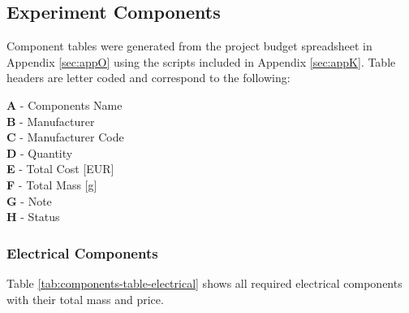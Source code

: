 \documentclass[a4paper,12pt,twoside]{article}
\begin{document}
\raggedbottom
\begin{landscape}
\subsection{Experiment Components} \label{components}
\label{sec:experiment-components}

Component tables were generated from the project budget spreadsheet in Appendix \ref{sec:appO} using the scripts included in Appendix \ref{sec:appK}. Table headers are letter coded and correspond to the following:

\textbf{A} - Components Name\\
\textbf{B} - Manufacturer\\
\textbf{C} - Manufacturer Code\\
\textbf{D} - Quantity\\
\textbf{E} - Total Cost [EUR]\\
\textbf{F} - Total Mass [g]\\
\textbf{G} - Note\\
\textbf{H} - Status\\

\subsubsection{Electrical Components}

Table \ref{tab:components-table-electrical} shows all required electrical components with their total mass and price.\\


\end{landscape}
\end{document}

